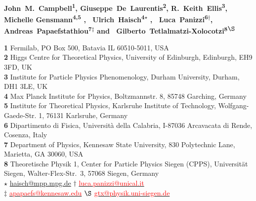 \documentclass{SciPost}
\providecommand{\DIFaddtex}[1]{{\protect\color{red} #1}} %
\providecommand{\DIFdeltex}[1]{} %
\providecommand{\DIFaddbegin}{} %
\providecommand{\DIFaddend}{} %
\providecommand{\DIFdelbegin}{} %
\providecommand{\DIFdelend}{} %
\providecommand{\DIFadd}[1]{\texorpdfstring{\DIFaddtex{#1}}{#1}} %
\providecommand{\DIFdel}[1]{\texorpdfstring{\DIFdeltex{#1}}{}} %
\begin{document}
\pagestyle{SPstyle}

\DIFdelbegin %
\DIFdelend \DIFaddbegin \begin{center}{\Large \textbf{\color{red}{
Triple-Higgs-boson probes of the Higgs potential and top--Higgs-boson interactions
}}}\DIFaddend \end{center}

\begin{center}\textbf{
{John~M.~Campbell}\textsuperscript{1},
{Giuseppe~De~Laurentis}\textsuperscript{2},
{R.~Keith~Ellis}\textsuperscript{3},
{Michelle Gensmann}\textsuperscript{4,5}\DIFadd{,\ }
{Ulrich~Haisch}\textsuperscript{4$\star$}\DIFadd{,\ }
\DIFadd{{Luca~Panizzi}\textsuperscript{6$\dagger$},\ }
\DIFadd{{Andreas~Papaefstathiou}\textsuperscript{7$\ddagger$} and\ }
\DIFadd{{Gilberto~Tetlalmatzi-Xolocotzi}\textsuperscript{8$\S$}}
}\end{center}

\begin{center}
{\bf 1 }{Fermilab, PO Box 500, Batavia IL 60510-5011, USA} \\
{\bf 2 }{Higgs Centre for Theoretical Physics, University of Edinburgh, Edinburgh, EH9 3FD, UK} \\
{\bf 3 }{Institute for Particle Physics Phenomenology, Durham University, Durham, DH1 3LE, UK} \\
{\bf 4 }{Max Planck Institute for Physics, Boltzmannstr. 8, 85748 Garching, Germany} \\
{\bf 5 }{Institute for Theoretical Physics, Karlsruhe Institute of Technology, Wolfgang-Gaede-Str. 1, 76131 Karlsruhe, Germany\DIFdelbegin \DIFdel{.}\DIFdelend} \\
\DIFaddbegin \DIFadd{{\bf 6 }{Dipartimento di Fisica, Università della Calabria, I-87036 Arcavacata di Rende, Cosenza, Italy}}\DIFaddend \\
\DIFaddbegin \DIFadd{{\bf 7 }{Department of Physics, Kennesaw State University, 830 Polytechnic Lane, Marietta, GA 30060, USA}}\DIFaddend \\
\DIFaddbegin \DIFadd{{\bf 8 }{Theoretische Physik 1, Center for Particle Physics Siegen (CPPS), Universität Siegen, Walter-Flex-Str.~3, 57068 Siegen, Germany}}\DIFaddend
\\[\baselineskip]
$\star$ \href{mailto:haisch@mpp.mpg.de}{\small haisch@mpp.mpg.de}\DIFaddbegin \DIFadd{\qquad $\dagger$ \href{mailto:luca.panizzi@unical.it}{\textcolor{red}{\small luca.panizzi@unical.it}}}\DIFaddend \\
\DIFaddbegin \DIFadd{$\ddagger$ \href{mailto:apapaefs@kennesaw.edu}{\textcolor{red}{\small apapaefs@kennesaw.edu}} \qquad $\S$ \href{mailto:gtx@physik.uni-siegen.de}{\textcolor{red}{\small gtx@physik.uni-siegen.de}}}\DIFaddend
\end{center}
\end{document}
